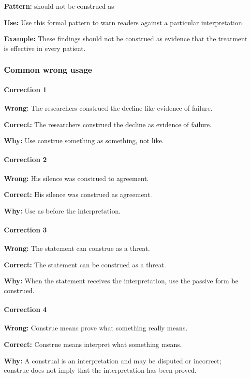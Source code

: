 \documentclass[11pt]{article}
\begin{document}
\textbf{Pattern:} should not be construed as

\textbf{Use:} Use this formal pattern to warn readers against a particular interpretation.

\textbf{Example:} These findings should not be construed as evidence that the treatment is effective in every patient.

\subsubsection{Common wrong usage}
\paragraph{Correction 1}
\textbf{Wrong:} The researchers construed the decline like evidence of failure.

\textbf{Correct:} The researchers construed the decline as evidence of failure.

\textbf{Why:} Use construe something as something, not like.

\paragraph{Correction 2}
\textbf{Wrong:} His silence was construed to agreement.

\textbf{Correct:} His silence was construed as agreement.

\textbf{Why:} Use as before the interpretation.

\paragraph{Correction 3}
\textbf{Wrong:} The statement can construe as a threat.

\textbf{Correct:} The statement can be construed as a threat.

\textbf{Why:} When the statement receives the interpretation, use the passive form be construed.

\paragraph{Correction 4}
\textbf{Wrong:} Construe means prove what something really means.

\textbf{Correct:} Construe means interpret what something means.

\textbf{Why:} A construal is an interpretation and may be disputed or incorrect; construe does not imply that the interpretation has been proved.
\end{document}
